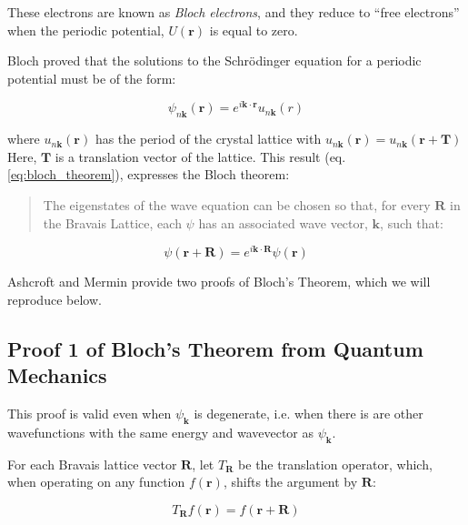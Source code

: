 These electrons are known as \textit{Bloch electrons}, and they reduce to ``free electrons'' when the periodic potential, $U(\boldsymbol{r})$ is equal to zero.

Bloch proved that the solutions to the Schrödinger equation for a periodic potential must be of the form:

\begin{equation} \label{eq:bloch_theorem}
\psi_{n\boldsymbol{k}}(\boldsymbol{r}) 
= e^{i\boldsymbol{k} \cdot \boldsymbol{r}}
u_{n\boldsymbol{k}}(r)
\end{equation}

where $u_{n\boldsymbol{k}}(\boldsymbol{r})$ has the period of the crystal lattice with $u_{n\boldsymbol{k}}(\boldsymbol{r}) = u_{n\boldsymbol{k}}(\boldsymbol{r} + \boldsymbol{T})$ 
Here, $\boldsymbol{T}$ is a translation vector of the lattice. This result (eq. \ref{eq:bloch_theorem}), expresses the Bloch theorem:
\begin{quotation}
The eigenstates of the wave equation can be chosen so that, for every $\boldsymbol{R}$ in the Bravais Lattice, each $\psi$ has an associated wave vector, $\boldsymbol{k}$, such that:
\end{quotation}

\begin{equation} \label{eq:bloch_theorem_restate}
\psi(\boldsymbol{r} + \boldsymbol{R})
= e^{i\boldsymbol{k} \cdot \boldsymbol{R}}
\psi(\boldsymbol{r})
\end{equation}


Ashcroft and Mermin provide two proofs of Bloch's Theorem, which we will reproduce below.

\subsection{Proof 1 of Bloch's Theorem from Quantum Mechanics}
This proof is valid even when $\psi_{\boldsymbol{k}}$ is degenerate, i.e. when there is are other wavefunctions with the same energy and wavevector as $\psi_{\boldsymbol{k}}$.

For each Bravais lattice vector $\boldsymbol{R}$, let $T_{\boldsymbol{R}}$ be the translation operator, which, when operating on any function $f(\boldsymbol{r})$, shifts the argument by $\boldsymbol{R}$:

\begin{equation} \label{eq:translation}
T_{\boldsymbol{R}} f(\boldsymbol{r})
= f(\boldsymbol{r} + \boldsymbol{R})
\end{equation}

